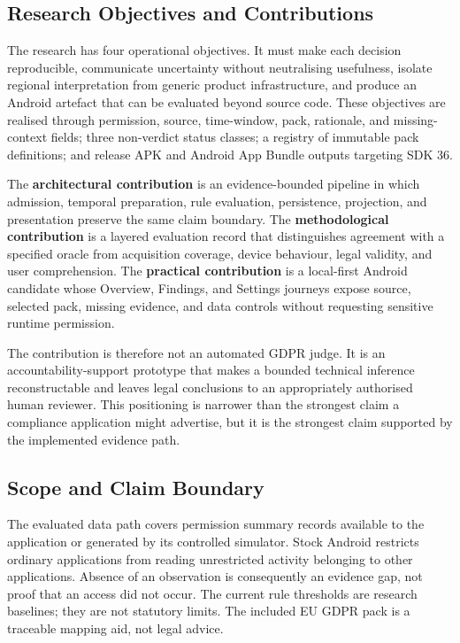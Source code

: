 \subsection{Research Objectives and Contributions}

The research has four operational objectives. It must make each decision reproducible, communicate uncertainty without neutralising usefulness, isolate regional interpretation from generic product infrastructure, and produce an Android artefact that can be evaluated beyond source code. These objectives are realised through permission, source, time-window, pack, rationale, and missing-context fields; three non-verdict status classes; a registry of immutable pack definitions; and release APK and Android App Bundle outputs targeting SDK 36.

The \textbf{architectural contribution} is an evidence-bounded pipeline in which admission, temporal preparation, rule evaluation, persistence, projection, and presentation preserve the same claim boundary. The \textbf{methodological contribution} is a layered evaluation record that distinguishes agreement with a specified oracle from acquisition coverage, device behaviour, legal validity, and user comprehension. The \textbf{practical contribution} is a local-first Android candidate whose Overview, Findings, and Settings journeys expose source, selected pack, missing evidence, and data controls without requesting sensitive runtime permission.

The contribution is therefore not an automated GDPR judge. It is an accountability-support prototype that makes a bounded technical inference reconstructable and leaves legal conclusions to an appropriately authorised human reviewer. This positioning is narrower than the strongest claim a compliance application might advertise, but it is the strongest claim supported by the implemented evidence path.

\subsection{Scope and Claim Boundary}

The evaluated data path covers permission summary records available to the application or generated by its controlled simulator. Stock Android restricts ordinary applications from reading unrestricted activity belonging to other applications. Absence of an observation is consequently an evidence gap, not proof that an access did not occur. The current rule thresholds are research baselines; they are not statutory limits. The included EU GDPR pack is a traceable mapping aid, not legal advice.

